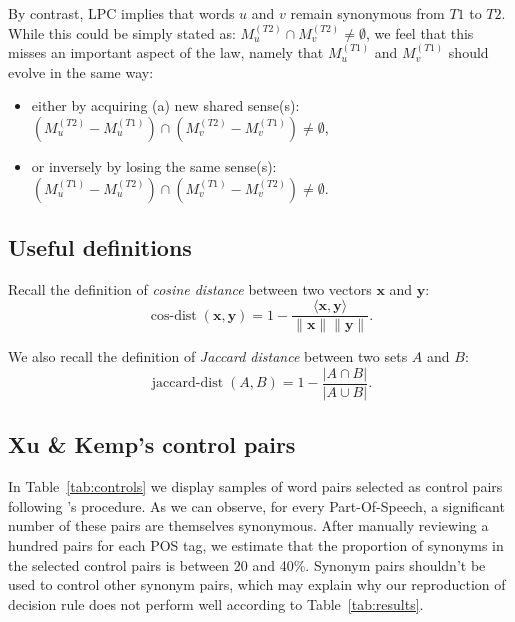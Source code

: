\documentclass[11pt]{article}
\newcommand{\jaccdist}[2]{1-\frac{\vert #1 \cap #2 \vert}{\vert #1 \cup #2 \vert}}
\begin{document}
By contrast, LPC implies that words $u$ and $v$ remain synonymous from $T1$ to $T2$. While this could be simply stated as: $M_u^{(T2)}\cap M_v^{(T2)}\neq\emptyset$, we feel that this misses an important aspect of the law, namely that $M_u^{(T1)}$ and $M_v^{(T1)}$ should evolve in the same way:
\begin{itemize}
    \item either by acquiring (a) new shared sense(s): $(M_u^{(T2)}-M_u^{(T1)})\cap (M_v^{(T2)}-M_v^{(T1)})\neq\emptyset$,
    \item  or inversely by losing the same sense(s): $(M_u^{(T1)}-M_u^{(T2)})\cap( M_v^{(T1)}-M_v^{(T2)})\neq\emptyset$. 
\end{itemize}



\subsection{Useful definitions}
\label{appendix:definitions}

Recall the definition of \textit{cosine distance} between two vectors $\mathbf{x}$ and $\mathbf{y}$:
\begin{equation}
   \operatorname{cos-dist}(\mathbf{x},\mathbf{y}) = 1-\frac{\langle \mathbf{x} , \mathbf{y} \rangle}{\lVert \mathbf{x} \rVert \lVert \mathbf{y} \rVert }.
\end{equation}  

We also recall the definition of \textit{Jaccard distance} between two sets $A$ and $B$:
\begin{equation}
    \operatorname{jaccard-dist}(A,B) = \jaccdist{A}{B}.
\end{equation}

\subsection{Xu \& Kemp's control pairs}
\label{appendix:xkcontrols}

In Table~\ref{tab:controls} we display samples of word pairs selected as control pairs following \citet{xu-kemp-2015-evaluation}'s procedure. As we can observe, for every Part-Of-Speech, a significant number of these pairs are themselves synonymous. After manually reviewing a hundred pairs for each POS tag, we estimate that the proportion of synonyms in the selected control pairs is between 20 and 40\%. Synonym pairs shouldn't be used to control other synonym pairs, which may explain why our reproduction of \citet{xu-kemp-2015-evaluation} decision rule does not perform well according to Table~\ref{tab:results}. 
\end{document}

